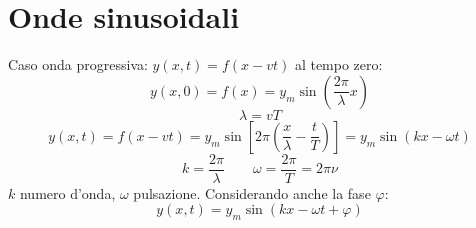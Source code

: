 \section{Onde sinusoidali}
Caso onda progressiva: $y(x,t)=f(x-vt)$
al tempo zero:
\begin{equation*}y(x,0)=f(x)=y_m\sin\left(\frac{2\pi}{\lambda} x\right)\end{equation*}
\begin{equation*}\lambda=vT\end{equation*}
\begin{equation*}y(x,t)=f(x-vt)=y_m\sin\left[2\pi\left(\frac{x}{\lambda}-\frac{t}{T}\right)\right]=y_m\sin\left(kx-\omega t\right)\end{equation*}
\begin{equation*}k=\frac{2\pi}{\lambda}\qquad \omega=\frac{2\pi}{T}=2\pi\nu\end{equation*}
$k$ numero d'onda, $\omega$ pulsazione. Considerando anche la fase $\varphi$:
\begin{equation*}y(x,t)=y_m\sin\left(kx-\omega t+\varphi\right)\end{equation*}

